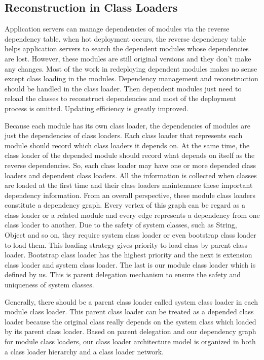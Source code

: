 \documentclass[conference]{IEEEtran}
\begin{document}
\subsection{Reconstruction in Class Loaders}
Application servers can manage dependencies of modules via the reverse dependency table.
when hot deployment occurs, the reverse dependency table helps application servers to search the dependent modules whose dependencies are lost.
However, these modules are still original versions and they don't make any changes.
Most of the work in redeploying dependent modules makes no sense except class loading in the modules.
Dependency management and reconstruction should be handled in the class loader.
Then dependent modules just need to reload the classes to reconstruct dependencies and most of the deployment process is omitted.
Updating efficiency is greatly improved.

Because each module has its own class loader, the dependencies of modules are just the dependencies of class loaders.
Each class loader that represents each module should record which class loaders it depends on.
At the same time, the class loader of the depended module should record what depends on itself as the reverse dependencies.
So, each class loader may have one or more depended class loaders and dependent class loaders.
All the information is collected when classes are loaded at the first time and their class loaders maintenance these important dependency information. 
From an overall perspective, these module class loaders constitute a dependency graph.
Every vertex of this graph can be regard as a class loader or a related module and every edge represents a dependency from one class loader to another.
Due to the safety of system classes, such as String, Object and so on, they require system class loader or even bootstrap class loader to load them.
This loading strategy gives priority to load class by parent class loader.
Bootstrap class loader has the highest priority and the next is extension class loader and system class loader.
The last is our module class loader which is defined by us.
This is parent delegation mechanism\cite{parent_delegation} to ensure the safety and uniqueness of system classes.

Generally, there should be a parent class loader called system class loader in each module class loader.
This parent class loader can be treated as a depended class loader because the original class really depends on the system class which loaded by its parent class loader.
Based on parent delegation and our dependency graph for module class loaders, our class loader architecture model is organized in both a class loader hierarchy and a class loader network\cite{class_loader_patent}.
\end{document}
